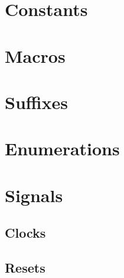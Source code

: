   \section{Constants}
  \label{naming:constants}

  \section{Macros}
  \label{naming:macros}

  \section{Suffixes}
  \label{naming:suffixes}

  \section{Enumerations}
  \label{naming:enumerations}

  \section{Signals}
  \label{naming:signals}

    \subsection{Clocks}
    \label{naming:signals:clocks}

    \subsection{Resets}
    \label{naming:signals:resets}